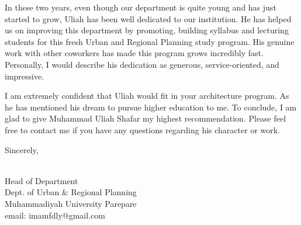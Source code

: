\documentclass[12pt,a4paper]{letter}
\makeatletter
\renewcommand{\closing}[1]{
	\vspace{2.5mm} %
	\noindent %
	\hspace*{\longindentation} %
	\parbox{\indentedwidth}{
		\raggedright
		#1 %
		\vskip 1.95cm %
        \begin{spacing}{.75}

		\textbf{\fromsig} \\ %
\small Head of Department\\
\small Dept. of Urban \& Regional Planning\\
\small Muhammadiyah University Parepare\\
\small email: imamfdly@gmail.com
        \end{spacing}
	}
}
\makeatother
\begin{document}
In these two years, even though our department is quite young and has just started to grow, Uliah has been well dedicated to our institution.
He has helped us on improving this department by promoting, building syllabus and lecturing students for this fresh Urban and Regional Planning study program.
His genuine work with other coworkers has made this program grows incredibly fast. Personally, I would describe his dedication as generous, service-oriented, and impressive.

I am extremely confident that Uliah would fit in your architecture program. As he has mentioned his dream to pursue higher education to me. To conclude, I am glad to give Muhammad Uliah Shafar my highest recommendation. Please feel free to contact me if you have any questions regarding his character or work.

\closing{Sincerely,}
\end{document}
